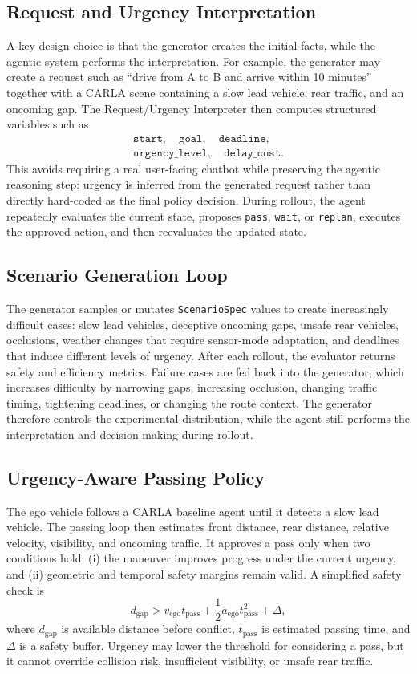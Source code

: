 \documentclass[10pt,twocolumn,letterpaper]{article}
\begin{document}
\subsection{Request and Urgency Interpretation}
A key design choice is that the generator creates the initial facts, while the agentic system performs the interpretation. For example, the generator may create a request such as ``drive from A to B and arrive within 10 minutes'' together with a CARLA scene containing a slow lead vehicle, rear traffic, and an oncoming gap. The Request/Urgency Interpreter then computes structured variables such as
\begin{align*}
\texttt{start},\quad \texttt{goal},\quad \texttt{deadline},\quad \\
\texttt{urgency\_level},\quad \texttt{delay\_cost}.
\end{align*}
This avoids requiring a real user-facing chatbot while preserving the agentic reasoning step: urgency is inferred from the generated request rather than directly hard-coded as the final policy decision. During rollout, the agent repeatedly evaluates the current state, proposes \texttt{pass}, \texttt{wait}, or \texttt{replan}, executes the approved action, and then reevaluates the updated state.

\subsection{Scenario Generation Loop}
The generator samples or mutates \texttt{ScenarioSpec} values to create increasingly difficult cases: slow lead vehicles, deceptive oncoming gaps, unsafe rear vehicles, occlusions, weather changes that require sensor-mode adaptation, and deadlines that induce different levels of urgency. After each rollout, the evaluator returns safety and efficiency metrics. Failure cases are fed back into the generator, which increases difficulty by narrowing gaps, increasing occlusion, changing traffic timing, tightening deadlines, or changing the route context. The generator therefore controls the experimental distribution, while the agent still performs the interpretation and decision-making during rollout.

\subsection{Urgency-Aware Passing Policy}
The ego vehicle follows a CARLA baseline agent until it detects a slow lead vehicle. The passing loop then estimates front distance, rear distance, relative velocity, visibility, and oncoming traffic. It approves a pass only when two conditions hold: (i) the maneuver improves progress under the current urgency, and (ii) geometric and temporal safety margins remain valid. A simplified safety check is
\[
d_{\mathrm{gap}} >
v_{\mathrm{ego}}t_{\mathrm{pass}}
+\frac{1}{2}a_{\mathrm{ego}}t_{\mathrm{pass}}^2+\Delta,
\]
where \(d_{\mathrm{gap}}\) is available distance before conflict, \(t_{\mathrm{pass}}\) is estimated passing time, and \(\Delta\) is a safety buffer. Urgency may lower the threshold for considering a pass, but it cannot override collision risk, insufficient visibility, or unsafe rear traffic.
\end{document}
